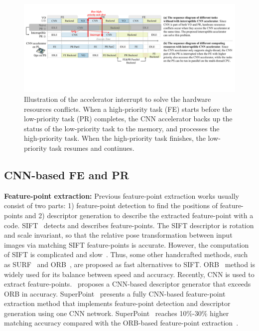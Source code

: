 
\label{sec:relate}


\begin{figure}[t]
	\centering
 \includegraphics[width=0.95\linewidth]{fig/interDPR.pdf}
 \vspace{-2mm}
 \caption{Illustration of the accelerator interrupt to solve the hardware resources conflicts. When a high-priority task (FE) starts before the low-priority task (PR) completes, the CNN accelerator backs up the status of the low-priority task to the memory, and processes the high-priority task. When the high-priority task finishes, the low-priority task resumes and continues.
 }
	\label{fig:interDPR}
\end{figure}


\subsection{ CNN-based FE and PR }

\textbf{Feature-point extraction:} Previous feature-point extraction works usually consist of two parts: 1) feature-point detection to find the positions of feature-points and 2) descriptor generation to describe the extracted feature-point with a code.
SIFT~\cite{Lowe-478} detects and describes feature-points. The SIFT descriptor is rotation and scale invariant, so that the relative pose transformation between input images via matching SIFT feature-points is accurate. However, the computation of SIFT is complicated and slow~\cite{bay2006surf}. Thus, some other handcrafted methods, such as SURF~\cite{bay2006surf} and ORB~\cite{Mur-Artal:2017281}, are proposed as fast alternatives to SIFT. ORB~\cite{Mur-Artal:2017281} method is widely used for its balance between speed and accuracy.
Recently, CNN is used to extract feature-points.~\cite{simo2015discriminative} proposes a CNN-based descriptor generator that exceeds ORB in accuracy.
SuperPoint~\cite{detone2018superpoint} presents a fully CNN-based feature-point extraction method that implements feature-point detection and descriptor generation using one CNN network. SuperPoint~\cite{detone2018superpoint} reaches 10\%-30\% higher matching accuracy compared with the ORB-based feature-point extraction~\cite{Mur-Artal:2017281}. 

